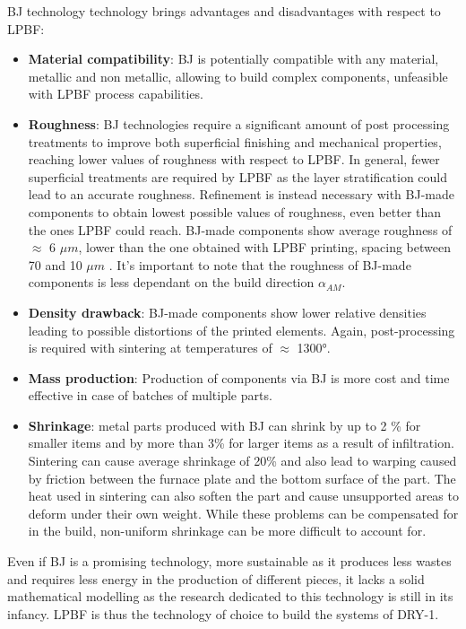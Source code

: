 BJ technology technology brings advantages and disadvantages with respect to LPBF:
\begin{itemize}
  \item \textbf{Material compatibility}: BJ is potentially compatible with any material, metallic and non metallic, allowing to build complex components, unfeasible with LPBF process capabilities.
  \item \textbf{Roughness}: BJ technologies require a significant amount of post processing treatments to improve both superficial finishing and mechanical properties, reaching lower values of roughness with respect to LPBF. In general, fewer superficial treatments are required by LPBF as the layer stratification could lead to an accurate roughness. Refinement is instead necessary with BJ-made components to obtain lowest possible values of roughness, even better than the ones LPBF could reach. BJ-made components show average roughness of $\approx$ 6 $\mu m$, lower than the one obtained with LPBF printing, spacing between 70 and 10 $\mu m$ \cite{tesi_dottorato}.
  It's important to note that the roughness of BJ-made components is less dependant on the build direction $\alpha_{AM}$.
  \item  \textbf{Density drawback}: BJ-made components show lower relative densities leading to possible distortions of the printed elements. Again, post-processing is required with sintering at temperatures of $\approx$ 1300°. 
  \item \textbf{Mass production}: Production of components via BJ is more cost and time effective in case of batches of multiple parts. 
  \item \textbf{Shrinkage}: metal parts produced with BJ can shrink by up to 2 \% for smaller items and by more than 3\% for larger items as a result of infiltration. Sintering can cause average shrinkage of 20\% and also lead to warping caused by friction between the furnace plate and the bottom surface of the part. The heat used in sintering can also soften the part and cause unsupported areas to deform under their own weight. While these problems can be compensated for in the build, non-uniform shrinkage can be more difficult to account for\cite{bj_camb}.
\end{itemize}

Even if BJ is a promising technology, more sustainable as it produces less wastes and requires less energy in the production of different pieces, it lacks a solid mathematical modelling\cite{bj_inconel} as the research dedicated to this technology is still in its infancy. LPBF is thus the technology of choice to build the systems of DRY-1.

